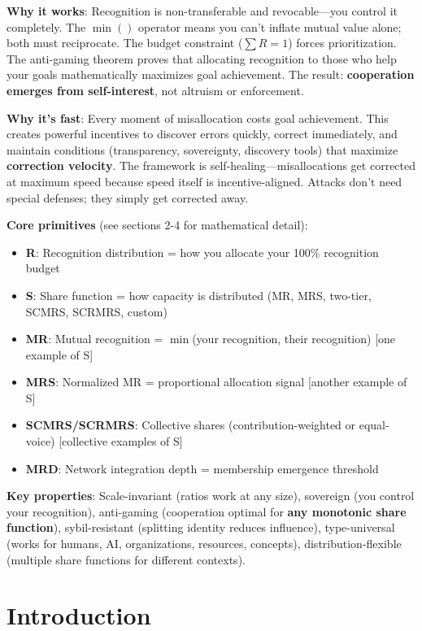 \documentclass[11pt,a4paper]{article}
\theoremstyle{definition}
\theoremstyle{remark}
\begin{document}
\textbf{Why it works}: Recognition is non-transferable and revocable---you control it completely. The $\min()$ operator means you can't inflate mutual value alone; both must reciprocate. The budget constraint ($\sum R=1$) forces prioritization. The anti-gaming theorem proves that allocating recognition to those who help your goals mathematically maximizes goal achievement. The result: \textbf{cooperation emerges from self-interest}, not altruism or enforcement.

\textbf{Why it's fast}: Every moment of misallocation costs goal achievement. This creates powerful incentives to discover errors quickly, correct immediately, and maintain conditions (transparency, sovereignty, discovery tools) that maximize \textbf{correction velocity}. The framework is self-healing---misallocations get corrected at maximum speed because speed itself is incentive-aligned. Attacks don't need special defenses; they simply get corrected away.

\textbf{Core primitives} (see sections 2-4 for mathematical detail):
\begin{itemize}
\item \textbf{R}: Recognition distribution = how you allocate your 100\% recognition budget
\item \textbf{S}: Share function = how capacity is distributed (MR, MRS, two-tier, SCMRS, SCRMRS, custom)
\item \textbf{MR}: Mutual recognition = $\min$(your recognition, their recognition) [one example of S]
\item \textbf{MRS}: Normalized MR = proportional allocation signal [another example of S]
\item \textbf{SCMRS/SCRMRS}: Collective shares (contribution-weighted or equal-voice) [collective examples of S]
\item \textbf{MRD}: Network integration depth = membership emergence threshold
\end{itemize}

\textbf{Key properties}: Scale-invariant (ratios work at any size), sovereign (you control your recognition), anti-gaming (cooperation optimal for \textbf{any monotonic share function}), sybil-resistant (splitting identity reduces influence), type-universal (works for humans, AI, organizations, resources, concepts), distribution-flexible (multiple share functions for different contexts).

\section{Introduction}
\end{document}
